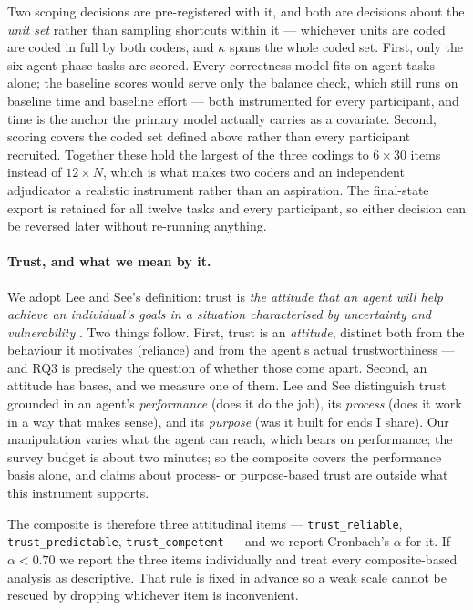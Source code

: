 \documentclass[acmsmall,review,screen]{acmart}
\newcommand{\code}[1]{\texttt{#1}}
\begin{document}
Two scoping decisions are pre-registered with it, and both are decisions about
the \emph{unit set} rather than sampling shortcuts within it --- whichever units
are coded are coded in full by both coders, and $\kappa$ spans the whole coded
set. First, only the six agent-phase tasks are scored. Every correctness model
fits on agent tasks alone; the baseline scores would serve only the balance
check, which still runs on baseline time and baseline effort --- both
instrumented for every participant, and time is the anchor the primary model
actually carries as a covariate. Second, scoring covers the coded set defined
above rather than every participant recruited. Together these hold the largest of
the three codings to $6\times30$ items instead of $12\times N$, which is what
makes two coders and an independent adjudicator a realistic instrument rather
than an aspiration. The final-state export is retained for all twelve tasks and
every participant, so either decision can be reversed later without re-running
anything.

\paragraph{Trust, and what we mean by it.} We adopt Lee and See's definition:
trust is \emph{the attitude that an agent will help achieve an individual's
goals in a situation characterised by uncertainty and vulnerability}
\cite{lee2004trust}. Two things follow. First, trust is an \emph{attitude},
distinct both from the behaviour it motivates (reliance) and from the agent's
actual trustworthiness --- and RQ3 is precisely the question of whether those
come apart. Second, an attitude has bases, and we measure one of them. Lee and
See distinguish trust grounded in an agent's \emph{performance} (does it do the
job), its \emph{process} (does it work in a way that makes sense), and its
\emph{purpose} (was it built for ends I share). Our manipulation varies what the
agent can reach, which bears on performance; the survey budget is about two
minutes; so the composite covers the performance basis alone, and claims about
process- or purpose-based trust are outside what this instrument supports.

The composite is therefore three attitudinal items --- \code{trust\_reliable},
\code{trust\_predictable}, \code{trust\_competent} --- and we report Cronbach's
$\alpha$ for it. If $\alpha < 0.70$ we report the three items individually and
treat every composite-based analysis as descriptive. That rule is fixed in
advance so a weak scale cannot be rescued by dropping whichever item is
inconvenient.
\end{document}
